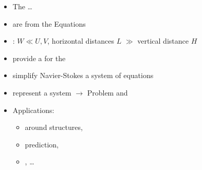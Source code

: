 %

\begin{frame}
\hspace{3.5cm}
\begin{minipage}{0.7\textwidth}
\begin{tcolorbox}    
\begin{itemize}
\setlength\itemsep{1.9em}
\item<1->[] The \textbf{} \dots
\item<1-> are  from the  Equations
\item<1-> :  $ W \ll U,V $, horizontal distances $L$ $\gg$ vertical distance $H$
\item<1-> provide a  for the 
\item<1-> simplify  Navier-Stokes  a  system of equations
\item<1-> represent a  system $\rightarrow$  Problem and 
\item<1-> Applications: 
\begin{itemize}
\addtolength{\itemindent}{1cm}
\item {} around structures, 
\item {} prediction,
\item {}, \dots
\end{itemize}
\end{itemize}
\end{tcolorbox}
\end{minipage}
\end{frame}
\clearpage



